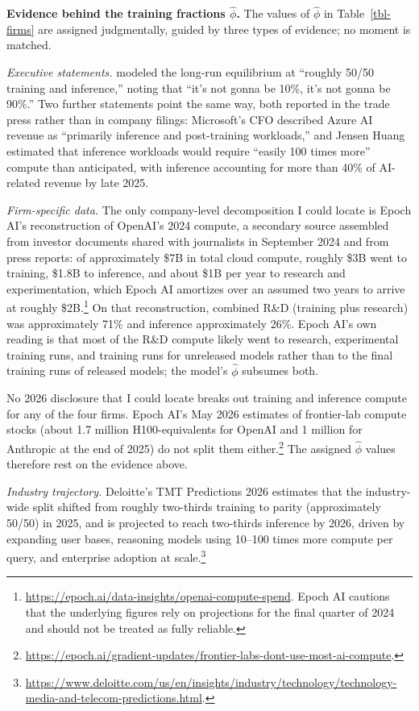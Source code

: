 \documentclass[
  11pt,
  letterpaper,
]{scrartcl}
\begin{document}
\textbf{Evidence behind the training fractions \(\hat{\phi}\).} The
values of \(\hat{\phi}\) in Table~\ref{tbl-firms} are assigned
judgmentally, guided by three types of evidence; no moment is matched.

\emph{Executive statements.} \citet{amodei2026dwarkesh} modeled the
long-run equilibrium at ``roughly 50/50 training and inference,'' noting
that ``it's not gonna be 10\%, it's not gonna be 90\%.'' Two further
statements point the same way, both reported in the trade press rather
than in company filings: Microsoft's CFO described Azure AI revenue as
``primarily inference and post-training workloads,'' and Jensen Huang
estimated that inference workloads would require ``easily 100 times
more'' compute than anticipated, with inference accounting for more than
40\% of AI-related revenue by late 2025.

\emph{Firm-specific data.} The only company-level decomposition I could
locate is Epoch AI's reconstruction of OpenAI's 2024 compute, a
secondary source assembled from investor documents shared with
journalists in September 2024 and from press reports: of approximately
\$7B in total cloud compute, roughly \$3B went to training, \$1.8B to
inference, and about \$1B per year to research and experimentation,
which Epoch AI amortizes over an assumed two years to arrive at roughly
\$2B.\footnote{\url{https://epoch.ai/data-insights/openai-compute-spend}.
  Epoch AI cautions that the underlying figures rely on projections for
  the final quarter of 2024 and should not be treated as fully reliable.}
On that reconstruction, combined R\&D (training plus research) was
approximately 71\% and inference approximately 26\%. Epoch AI's own
reading is that most of the R\&D compute likely went to research,
experimental training runs, and training runs for unreleased models
rather than to the final training runs of released models; the model's
\(\hat{\phi}\) subsumes both.

No 2026 disclosure that I could locate breaks out training and inference
compute for any of the four firms. Epoch AI's May 2026 estimates of
frontier-lab compute stocks (about 1.7 million H100-equivalents for
OpenAI and 1 million for Anthropic at the end of 2025) do not split them
either.\footnote{\url{https://epoch.ai/gradient-updates/frontier-labs-dont-use-most-ai-compute}.}
The assigned \(\hat{\phi}\) values therefore rest on the evidence above.

\emph{Industry trajectory.} Deloitte's TMT Predictions 2026 estimates
that the industry-wide split shifted from roughly two-thirds training to
parity (approximately 50/50) in 2025, and is projected to reach
two-thirds inference by 2026, driven by expanding user bases, reasoning
models using 10--100 times more compute per query, and enterprise
adoption at scale.\footnote{\url{https://www.deloitte.com/us/en/insights/industry/technology/technology-media-and-telecom-predictions.html}.}
\end{document}
